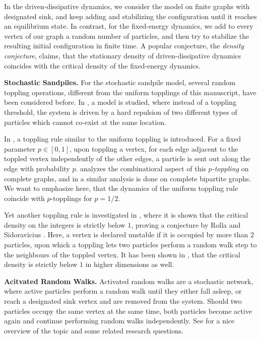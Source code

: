 \documentclass[11pt]{article}
\begin{document}
In the driven-dissipative dynamics, we consider the model on finite graphs with designated sink, and keep adding and stabilizing the configuration until it reaches an equilibrium state. In contrast, for the fixed-energy dynamics, we add to every vertex of our graph a random number of particles, and then try to stabilize the resulting initial configuration in finite time. A popular conjecture, the {\it density conjecture}, claims, that the stationary density of driven-dissipative dynamics coincides with the critical density of the fixed-energy dynamics.

\textbf{Stochastic Sandpiles.} For the stochastic sandpile model, several random toppling operations, different from the uniform topplings of this manuscript, have been considered before. In \cite{M91}, a model is studied, where instead of a toppling threshold, the system is driven by a hard repulsion of two different types of particles which cannot co-exist at the same location.

In \cite{ptoppling-CMS}, a toppling rule similar to the uniform toppling is introduced. For a fixed parameter $p\in[0,1]$, upon toppling a vertex, for each edge adjacent to the toppled vertex independently of the other edges, a particle is sent out along the edge with probability $p$. \cite{S24} analyzes the combinatioral aspect of this {\it $p$-toppling} on complete graphs, and in \cite{SZ25} a similar analysis is done on complete bipartite graphs. We want to emphasize here, that the dynamics of the uniform toppling rule coincide with $p$-topplings for $p=1/2.$

Yet another toppling rule is investigated in \cite{HHRR22}, where it is shown that the critical density on the integers is strictly below $1$, proving a conjecture by Rolla and Sidoravicius \cite{RS12}. Here, a vertex is declared unstable if it is occupied by more than $2$ particles, upon which a toppling lets two particles perform a random walk step to the neighbours of the toppled vertex. It has been shown in \cite{CFT24}, that the critical density is strictly below $1$ in higher dimensions as well.

\textbf{Acitvated Random Walks.} Activated random walks are a stochastic network, where active particles perform a random walk until they either fall asleep, or reach a designated sink vertex and are removed from the system. Should two particles occupy the same vertex at the same time, both particles become active again and continue performing random walks independently. See \cite{R15,LL24} for a nice overview of the topic and some related research questions.
\end{document}
